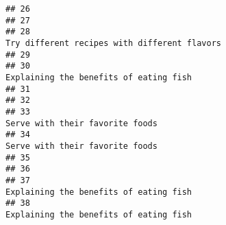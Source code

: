 \documentclass[
]{article}
\begin{document}
\begin{verbatim}
## 26                                                                                                                                                                                                              
## 27                                                                                                                                                                                                              
## 28                                                                                                                                                                  Try different recipes with different flavors
## 29                                                                                                                                                                                                              
## 30                                                                                                                                                                        Explaining the benefits of eating fish
## 31                                                                                                                                                                                                              
## 32                                                                                                                                                                                                              
## 33                                                                                                                                                                               Serve with their favorite foods
## 34                                                                                                                                                                               Serve with their favorite foods
## 35                                                                                                                                                                                                              
## 36                                                                                                                                                                                                              
## 37                                                                                                                                                                        Explaining the benefits of eating fish
## 38                                                                                                                                                                        Explaining the benefits of eating fish

\end{verbatim}
\end{document}

